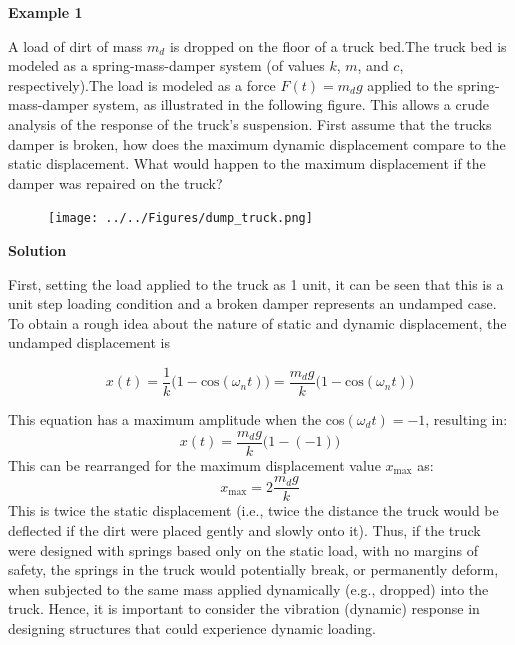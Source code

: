 \documentclass[12pt,a4paper]{article}
\begin{document}
\pagebreak

\textbf{Example 1}

A load of dirt of mass $m_d$ is dropped on the floor of a truck bed.The truck bed is modeled as a spring-mass-damper system (of values $k$, $m$, and $c$, respectively).The load is
modeled as a force $F(t) = m_dg$ applied to the spring-mass-damper system, as illustrated
in the following figure. This allows a crude analysis of the response of the truck's suspension. First assume that the trucks damper is broken, how does the maximum dynamic displacement compare to the static displacement. What would happen to the maximum displacement if the damper was repaired on the truck? %

\begin{figure}[H]
	\centering
	\texttt{[image: ../../Figures/dump\_truck.png]}
\end{figure}

\textbf{Solution }

First, setting the load applied to the truck as 1 unit, it can be seen that this is a unit step loading condition and a broken damper represents an undamped case. To obtain a rough idea about the nature of static and dynamic displacement, the undamped displacement is

\begin{equation}
	x(t) = \frac{1}{k}\big(1-\text{cos}(\omega_n t)\big) = \frac{m_dg}{k}\big(1-\text{cos}(\omega_n t)\big)
\end{equation}
 
This equation has a maximum amplitude when the cos$(\omega_dt)=-1$, resulting in:
\begin{equation}
	x(t) = \frac{m_dg}{k}\big(1-(-1)\big)
\end{equation}
This can be rearranged for the maximum displacement value $x_\text{max} $ as:
\begin{equation}
	x_\text{max} = 2\frac{m_dg}{k}
\end{equation} 
This is twice the static displacement (i.e., twice the distance the truck would be deflected if the dirt were placed gently and slowly onto it). Thus, if the truck were designed with springs based only on the static load, with no margins of safety, the springs in the truck
would potentially break, or permanently deform, when subjected to the same mass applied dynamically (e.g., dropped) into the truck. Hence, it is important to consider the vibration (dynamic) response in designing structures that could experience dynamic loading.
\end{document}
